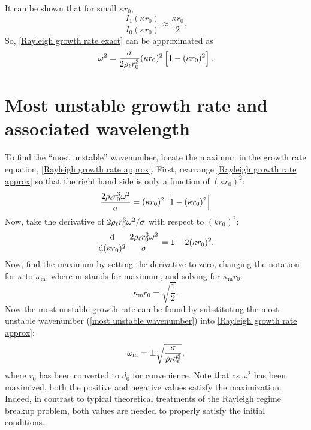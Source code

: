 It can be shown that for small $\kappa r_0$,
\begin{equation}
   \frac{I_1(\kappa r_0)}{I_0(\kappa r_0)} \approx \frac{\kappa r_0}{2}.
\end{equation}
So, \eqref{Rayleigh growth rate exact} can be approximated as
\begin{equation}
   \omega^2 = \frac{\sigma}{2 \rho_{\ell} r_0^3} (\kappa r_0)^2 \left[1 - (\kappa r_0)^2\right]. \label{eqn:Rayleigh growth rate approx}
\end{equation}

\section{Most unstable growth rate and associated wavelength}

To find the ``most unstable'' wavenumber, locate the maximum in the growth rate equation, \eqref{Rayleigh growth rate approx}. First, rearrange \eqref{Rayleigh growth rate approx} so that the right hand side is only a function of $(\kappa r_0)^2$:
\begin{equation}
   \frac{2 \rho_{\ell} r_0^3 \omega^2}{\sigma} = (\kappa r_0)^2 \left[1 - (\kappa r_0)^2\right]
\end{equation}
Now, take the derivative of $2 \rho_{\ell} r_0^3 \omega^2 / \sigma$ with respect to $(k r_0)^2$:
\begin{equation}
   \dod{}{{(\kappa r_0)^2}} \frac{2 \rhol r_0^3 \omega^2}{\sigma} = 1 - 2 (\kappa r_0)^2.
\end{equation}
Now, find the maximum by setting the derivative to zero, changing the notation for $\kappa$ to $\kappa_\text{m}$, where m stands for maximum, and solving for $\kappa_\text{m} r_0$:
\begin{equation}
   \kappa_\text{m} r_0 = \sqrt{\frac{1}{2}}. \label{eqn:most unstable wavenumber}
\end{equation}
Now the most unstable growth rate can be found by substituting the most unstable wavenumber (\eqref{most unstable wavenumber}) into \eqref{Rayleigh growth rate approx}:
\begin{equation}
   \omega_\text{m} = \pm \sqrt{\frac{\sigma}{\rho_{\ell} d_0^3}}, \label{eqn:most unstable growth rate}
\end{equation}
where $r_0$ has been converted to $d_0$ for convenience. Note that as $\omega^2$ has been maximized, both the positive and negative values satisfy the maximization. Indeed, in contrast to typical theoretical treatments of the Rayleigh regime breakup problem, both values are needed to properly satisfy the initial conditions.

